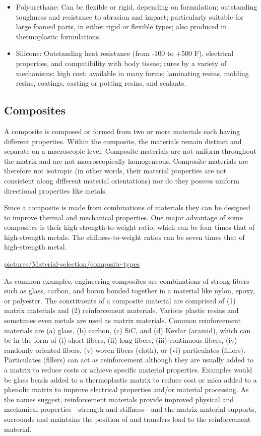 \documentclass[a4paper,openany,12pt]{book}
\begin{document}
\begin{enumerate}
\begin{itemize}
\item Polyurethane: Can be flexible or rigid, depending on formulation;
outstanding toughness and resistance to abrasion and impact;
particularly suitable for large foamed parts, in either rigid or
flexible types; also produced in thermoplastic formulations.

\item Silicone: Outstanding heat resistance (from -100 to +500 F),
electrical properties, and compatibility with body tissue; cures by a
variety of mechanisms; high cost; available in many forms; laminating
resins, molding resins, coatings, casting or potting resins, and
sealants.
\end{itemize}
\end{enumerate}

\subsection{Composites}
\label{composites}
A composite is composed or formed from two or more materials each having
different properties. Within the composite, the materials remain
distinct and separate on a macroscopic level. Composite materials are
not uniform throughout the matrix and are not macroscopically
homogeneous. Composite materials are therefore not isotropic (in other
words, their material properties are not consistent along different
material orientations) nor do they possess uniform directional
properties like metals.

Since a composite is made from combinations of materials they can be
designed to improve thermal and mechanical properties. One major
advantage of some composites is their high strength-to-weight ratio,
which can be four times that of high-strength metals. The
stiffness-to-weight ratios can be seven times that of high-strength
metal.


\url{pictures/Material-selection/composite-types}

As common examples, engineering composites are combinations of strong
fibers such as glass, carbon, and boron bonded together in a material
like nylon, epoxy, or polyester. The constituents of a composite
material are comprised of (1) matrix materials and (2) reinforcement
materials. Various plastic resins and sometimes even metals are used as
matrix materials. Common reinforcement materials are (a) glass, (b)
carbon, (c) SiC, and (d) Kevlar (aramid), which can be in the form of
(i) short fibers, (ii) long fibers, (iii) continuous fibers, (iv)
randomly oriented fibers, (v) woven fibers (cloth), or (vi) particulates
(fillers). Particulates (fillers) can act as reinforcement although they
are usually added to a matrix to reduce costs or achieve specific
material properties. Examples would be glass beads added to a
thermoplastic matrix to reduce cost or mica added to a phenolic matrix
to improve electrical properties and/or material processing. As the
names suggest, reinforcement materials provide improved physical and
mechanical properties---strength and stiffness---and the matrix material
supports, surrounds and maintains the position of and transfers load to
the reinforcement material.
\end{document}
